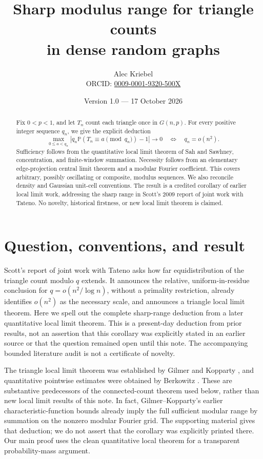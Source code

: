 \documentclass[11pt]{article}
\title{Sharp modulus range for triangle counts\\in dense random graphs}
\author{Alec Kriebel\\
\small ORCID: \href{https://orcid.org/0009-0001-9320-500X}{0009-0001-9320-500X}}
\date{Version 1.0 --- 17 October 2026}
\newcommand{\Pp}{\mathbb P}
\begin{document}
\maketitle
\begin{abstract}
Fix \(0<p<1\), and let \(T_n\) count each triangle once in \(G(n,p)\).
For every positive integer sequence \(q_n\), we give the explicit deduction
\[
 \max_{0\leq a<q_n}
 \left|q_n\Pp(T_n\equiv a\pmod {q_n})-1\right|\longrightarrow0
 \quad\Longleftrightarrow\quad q_n=o(n^2).
\]
Sufficiency follows from the quantitative local limit theorem of Sah and
Sawhney, concentration, and finite-window summation. Necessity follows from
an elementary edge-projection central limit theorem and a modular Fourier
coefficient. This covers arbitrary, possibly oscillating or composite,
modulus sequences. We also reconcile density and Gaussian unit-cell
conventions. The result is a credited corollary of earlier local limit
work, addressing the sharp range in Scott's 2009 report of joint work with
Tateno. No novelty, historical firstness, or new local limit theorem is claimed.
\end{abstract}

\section{Question, conventions, and result}

Scott's report of joint work with Tateno \cite[pp.~1279--1280]{ST}
asks how far equidistribution of the triangle count modulo \(q\) extends.
It announces the relative, uniform-in-residue conclusion for
\(q=o(n^2/\log n)\), without a primality restriction, already identifies
\(o(n^2)\) as the necessary scale, and announces a triangle local limit
theorem. Here we spell out the complete sharp-range deduction from a later
quantitative local limit theorem. This is a present-day deduction from
prior results, not an assertion that this corollary was explicitly stated
in an earlier source or that the question remained open until this note.
The accompanying bounded literature audit is not a certificate of novelty.

The triangle local limit theorem was established by Gilmer and Kopparty
\cite{GK}, and quantitative pointwise estimates were obtained by Berkowitz
\cite{B}. These are substantive predecessors of the connected-count theorem
used below, rather than new local limit results of this note.
In fact, Gilmer--Kopparty's earlier characteristic-function bounds
\cite[Lemmas~4--5 in the 2014 manuscript]{GK} already imply the full
sufficient modular range by summation on the nonzero modular Fourier grid.
The supporting material gives that deduction; we do not assert that the
corollary was explicitly printed there. Our main proof uses the clean
quantitative local theorem for a transparent probability-mass argument.
\end{document}
